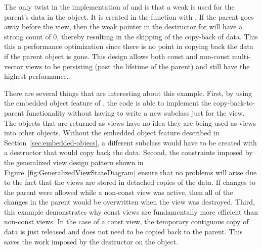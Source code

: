 \documentclass[pdf,ps2pdf,11pt]{SANDreport}
\begin{document}
The only twist in the implementation of
{} and
{} is that a weak {}
is used for the parent's {} data in the
{} object.  It is created in the
function {} with
{}.  If the parent goes away before
the view, then the weak pointer {} in the
destructor for {} will have a
strong count of 0, thereby resulting in the skipping of the copy-back
of data.  This this a performance optimization since there is no point
in copying back the data if the parent object is gone.  This design
allows both const and non-const multi-vector views to be persisting
(past the lifetime of the parent) and still have the highest
performance.


There are several things that are interesting about this example.
First, by using the embedded object feature of {}, the code
is able to implement the copy-back-to-parent functionality without
having to write a new {} subclass just for the view.
The {} objects that are returned as views
have no idea they are being used as views into other
{} objects.  Without the embedded object
feature described in Section~\ref{sec:embedded-objecs}, a different
{} subclass would have to be created with a
destructor that would copy back the data.  Second, the constraints
imposed by the generalized view design pattern shown in
Figure~\ref{fig:GeneralizedViewStateDiagram} ensure that no problems
will arise due to the fact that the views are stored in detached
copies of the data.  If changes to the parent
{} were allowed while a non-const
{} view was active, then all of the
changes in the parent would be overwritten when the
{} view was destroyed.  Third, this
example demonstrates why const views are fundamentally more efficient
than non-const views.  In the case of a const view, the temporary
contiguous copy of data is just released and does not need to be
copied back to the parent.  This saves the work imposed by the
destructor on the {} object.
\end{document}
